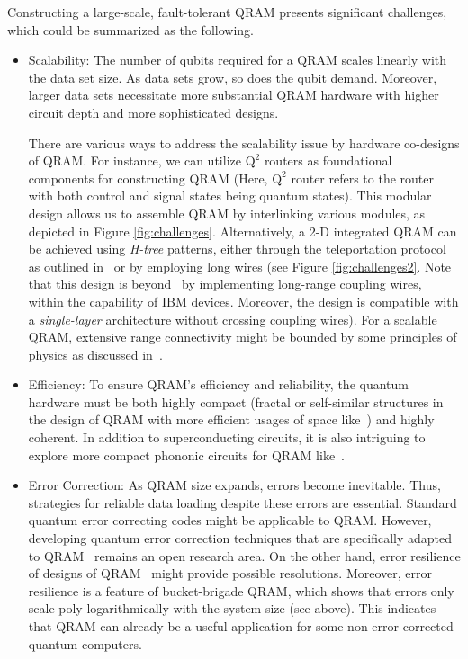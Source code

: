 Constructing a large-scale, fault-tolerant QRAM presents significant challenges, which could be summarized as the following.
\begin{itemize}
\item Scalability: The number of qubits required for a QRAM scales linearly with the data set size. As data sets grow, so does the qubit demand. Moreover, larger data sets necessitate more substantial QRAM hardware with higher circuit depth and more sophisticated designs.

There are various ways to address the scalability issue by hardware co-designs of QRAM. For instance, we can utilize $\text{Q}^2$ routers as foundational components for constructing QRAM (Here, $\text{Q}^2$ router refers to the router with both control and signal states being quantum states). This modular design allows us to assemble QRAM by interlinking various modules, as depicted in Figure \ref{fig:challenges}. Alternatively, a 2-D integrated QRAM can be achieved using \emph{H-tree} patterns, either through the teleportation protocol as outlined in~\cite{xu2023systems} or by employing long wires (see Figure \ref{fig:challenges2}. Note that this design is beyond~\cite{xu2023systems} by implementing long-range coupling wires, within the capability of IBM devices. Moreover, the design is compatible with a \emph{single-layer} architecture without crossing coupling wires). For a scalable QRAM, extensive range connectivity might be bounded by some principles of physics as discussed in~\cite{wang2023fundamental}. 

\item Efficiency: To ensure QRAM's efficiency and reliability, the quantum hardware must be both highly compact (fractal or self-similar structures in the design of QRAM with more efficient usages of space like~\cite{xu2023systems}) and highly coherent. In addition to superconducting circuits, it is also intriguing to explore more compact phononic circuits for QRAM like~\cite{hann2019hardware}.

\item Error Correction: As QRAM size expands, errors become inevitable. Thus, strategies for reliable data loading despite these errors are essential. Standard quantum error correcting codes might be applicable to QRAM. However, developing quantum error correction techniques that are specifically adapted to QRAM~\cite{di2020fault,jaques2023qram} remains an open research area. On the other hand, error resilience of designs of QRAM~\cite{hann2021resilience} might provide possible resolutions. Moreover, error resilience is a feature of bucket-brigade QRAM, which shows that errors only scale poly-logarithmically with the system size (see above). This indicates that QRAM can already be a useful application for some non-error-corrected quantum computers.


\end{itemize}
